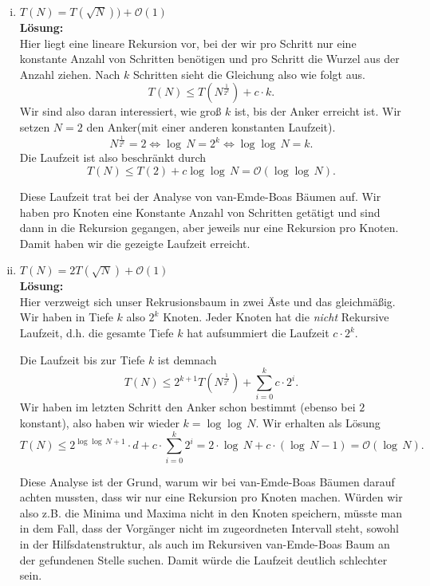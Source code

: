 \documentclass[11pt,a4paper,ngerman]{article}
\begin{document}
\begin{enumerate}[(i)]
	\item $T(N) = T(\sqrt{N})) + \mathcal{O}(1)$\\
	\noindent\textbf{Lösung:}\\
		Hier liegt eine lineare Rekursion vor, bei der wir pro Schritt nur eine konstante Anzahl von Schritten benötigen
		und pro Schritt die Wurzel aus der Anzahl ziehen. Nach $k$ Schritten sieht die Gleichung also wie folgt aus.
		$$
			T(N) \leq T(N^\frac{1}{2^k}) + c \cdot k.
		$$
		Wir sind also daran interessiert, wie groß $k$ ist, bis der Anker erreicht ist. Wir setzen $N=2$ den Anker(mit
		einer anderen konstanten Laufzeit).
		$$
			N^\frac{1}{2^k} = 2 \Leftrightarrow \log \, N = 2^k \Leftrightarrow \log\log \, N = k.
		$$
		Die Laufzeit ist also beschränkt durch
		$$
			T(N) \leq T(2) + c \log\log \, N = \mathcal{O}(\log\log \, N).
		$$

		Diese Laufzeit trat bei der Analyse von van-Emde-Boas Bäumen auf. Wir haben pro Knoten eine Konstante Anzahl von
		Schritten getätigt und sind dann in die Rekursion gegangen, aber jeweils nur eine Rekursion pro Knoten. Damit haben wir die
		gezeigte Laufzeit erreicht.

	\item $T(N) = 2T(\sqrt{N}) + \mathcal{O}(1)$\\
	\noindent\textbf{Lösung:}\\
		Hier verzweigt sich unser Rekrusionsbaum in zwei Äste und das gleichmäßig.
		Wir haben in Tiefe $k$ also $2^k$ Knoten. Jeder Knoten hat die \emph{nicht} Rekursive Laufzeit,
		d.h. die gesamte Tiefe $k$ hat aufsummiert die Laufzeit $c \cdot 2^k$.

		Die Laufzeit bis zur Tiefe $k$ ist demnach
		$$
			T(N) \leq 2^{k+1}T(N^\frac{1}{2^k}) + \sum_{i=0}^kc \cdot 2^i.
		$$
		Wir haben im letzten Schritt den Anker schon bestimmt (ebenso bei $2$ konstant), 
		also haben wir wieder $k = \log \log \, N$.
		Wir erhalten als Lösung
		$$
		T(N) \leq 2^{\log\log \, N + 1} \cdot d + c \cdot \sum_{i=0}^k 2^i = 2\cdot \log \, N + c \cdot (\log \, N - 1) = \mathcal{O}(\log \, N).
		$$

		Diese Analyse ist der Grund, warum wir bei van-Emde-Boas Bäumen darauf achten mussten, dass wir nur eine
		Rekursion pro Knoten machen. Würden wir also z.B. die Minima und Maxima nicht in den Knoten speichern, müsste
		man in dem Fall, dass der Vorgänger nicht im zugeordneten Intervall steht, sowohl in der Hilfsdatenstruktur, als auch im
		Rekursiven van-Emde-Boas Baum an der gefundenen Stelle suchen. Damit würde die Laufzeit deutlich schlechter sein.


\end{enumerate}
\end{document}
